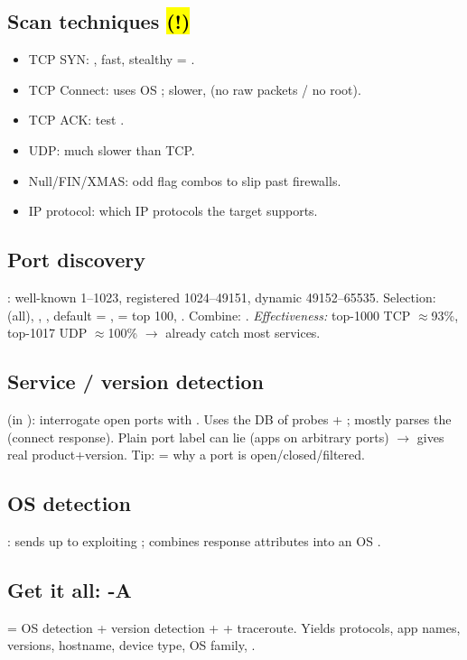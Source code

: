\subsection{Scan techniques \hl{(!)}}
\begin{itemize}
\item {} TCP SYN: , fast, stealthy = .
\item {} TCP Connect: uses OS ; slower,  (no raw packets / no root).
\item {} TCP ACK: test .
\item {} UDP: much slower than TCP.
\item {} Null/FIN/XMAS: odd flag combos to slip past  firewalls.
\item {} IP protocol: which IP protocols the target supports.
\end{itemize}

\subsection{Port discovery}
: well-known 1--1023, registered 1024--49151, dynamic 49152--65535. Selection:  (all), , , default = ,  = top 100, . Combine: .
\textit{Effectiveness:} top-1000 TCP $\approx$93\%, top-1017 UDP $\approx$100\% $\to$  already catch most services.

\subsection{Service / version detection}
 (in ): interrogate open ports with . Uses the  DB of probes + ; mostly parses the  (connect response). Plain port label can lie (apps on arbitrary ports) $\to$  gives real product+version. Tip:  = why a port is open/closed/filtered.

\subsection{OS detection}
: sends up to  exploiting ; combines response attributes into an OS .

\subsection{Get it all: -A}
 = OS detection + version detection +  + traceroute. Yields protocols, app names, versions, hostname, device type, OS family, .


